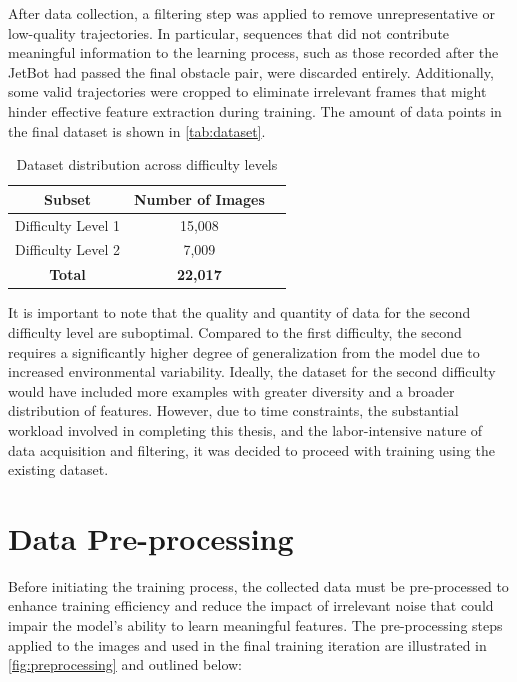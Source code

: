 After data collection, a filtering step was applied to remove unrepresentative or low-quality trajectories. In particular, sequences that did not contribute meaningful information to the learning process, such as those recorded after the JetBot had passed the final obstacle pair, were discarded entirely. Additionally, some valid trajectories were cropped to eliminate irrelevant frames that might hinder effective feature extraction during training. The amount of data points in the final dataset is shown in \autoref{tab:dataset}.

\begin{table}[htbp]
  \centering
  \caption{Dataset distribution across difficulty levels}
  \begin{tabular}{|c|c|c|}
    \hline
    \textbf{Subset} & \textbf{Number of Images} \\
    \hline
    Difficulty Level 1 & 15,008 \\
    Difficulty Level 2 & 7,009 \\
    \hline
    \textbf{Total} & \textbf{22,017} \\
    \hline
  \end{tabular}
  \label{tab:dataset}
\end{table}

It is important to note that the quality and quantity of data for the second difficulty level are suboptimal. Compared to the first difficulty, the second requires a significantly higher degree of generalization from the model due to increased environmental variability. Ideally, the dataset for the second difficulty would have included more examples with greater diversity and a broader distribution of features. However, due to time constraints, the substantial workload involved in completing this thesis, and the labor-intensive nature of data acquisition and filtering, it was decided to proceed with training using the existing dataset.

\section{Data Pre-processing}

Before initiating the training process, the collected data must be pre-processed to enhance training efficiency and reduce the impact of irrelevant noise that could impair the model's ability to learn meaningful features. The pre-processing steps applied to the images and used in the final training iteration are illustrated in \autoref{fig:preprocessing} and outlined below:

